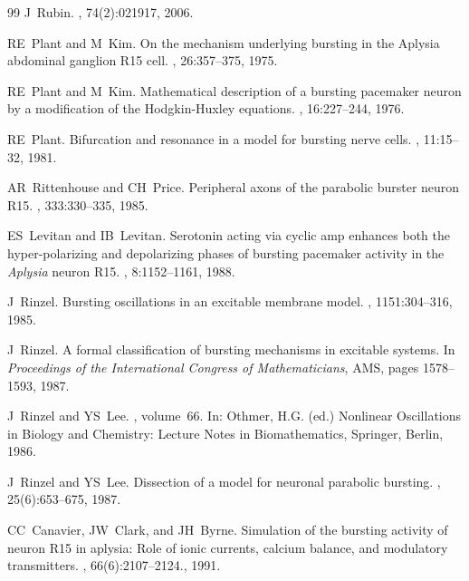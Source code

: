 \documentclass[nofootinbib,aip,amsmath,amssymb,reprint,twocolumn,10pt]{revtex4-2}
\begin{document}
\begin{thebibliography}{99}
J~Rubin.
, 74(2):021917, 2006.

RE~Plant and M~Kim.
\newblock On the mechanism underlying bursting in the Aplysia abdominal
  ganglion R15 cell.
, 26:357--375, 1975.

RE~Plant and M~Kim.
\newblock Mathematical description of a bursting pacemaker neuron by a
  modification of the Hodgkin-Huxley equations.
, 16:227--244, 1976.

RE~Plant.
\newblock Bifurcation and resonance in a model for bursting nerve cells.
, 11:15--32, 1981.

AR~Rittenhouse and CH~Price.
\newblock Peripheral axons of the parabolic burster neuron R15.
, 333:330--335, 1985.

ES~Levitan and IB~Levitan.
\newblock Serotonin acting via cyclic amp enhances both the hyper-polarizing and
  depolarizing phases of bursting pacemaker activity in the {\em Aplysia} neuron
  {R}15.
, 8:1152--1161, 1988.

J~Rinzel.
\newblock Bursting oscillations in an excitable membrane model.
, 1151:304--316, 1985.


J~Rinzel.
\newblock A formal classification of bursting mechanisms in excitable systems.
\newblock In {\em Proceedings of the International Congress of Mathematicians}, AMS, pages 1578--1593, 1987.

J~Rinzel and YS~Lee.
,
  volume~66.
\newblock In: Othmer, H.G. (ed.) Nonlinear Oscillations in Biology and
  Chemistry: Lecture Notes in Biomathematics, Springer, Berlin, 1986.

J~Rinzel and YS~Lee.
\newblock Dissection of a model for neuronal parabolic bursting.
, 25(6):653--675, 1987.


CC~Canavier, JW~Clark, and JH~Byrne.
\newblock Simulation of the bursting activity of neuron {R}15 in aplysia: Role
  of ionic currents, calcium balance, and modulatory transmitters.
, 66(6):2107--2124., 1991.



\end{thebibliography}
\end{document}
